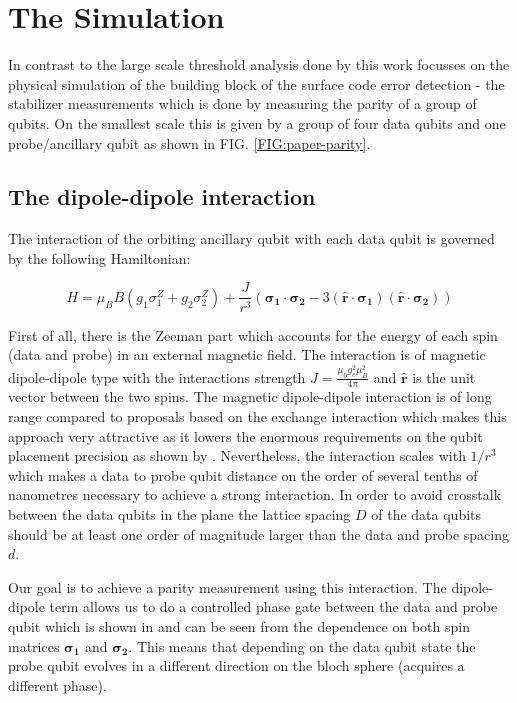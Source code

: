 \section{The Simulation}
In contrast to the large scale threshold analysis done by \citet{OGorman2016} this work focusses on the physical simulation of the building block of the surface code error detection - the stabilizer measurements which is done by measuring the parity of a group of qubits. On the smallest scale this is given by a group of four data qubits and one probe/ancillary qubit as shown in FIG. \ref{FIG:paper-parity}. 

\subsection{The dipole-dipole interaction}\label{sec:dipole-dipole}

The interaction of the orbiting ancillary qubit with each data qubit is governed by the following Hamiltonian:

\begin{equation*}
H = \mu_B B( g_1 \sigma_1^Z + g_2 \sigma_2^Z) + \frac{J}{r^3} ( \mathbf{\sigma_1} \cdot \mathbf{\sigma_2} - 3 ( \hat{\mathbf{r}} \cdot \mathbf{\sigma_1}) ( \hat{\mathbf{r}}\cdot \mathbf{\sigma_2}))
\end{equation*}

First of all, there is the Zeeman part which accounts for the energy of each spin (data and probe) in an external magnetic field. The interaction is of magnetic dipole-dipole type with the interactions strength $J=\frac{\mu_0 g_e^2 \mu_B^2}{4\pi}$ and $\hat{\mathbf{r}}$ is the unit vector between the two spins. The magnetic dipole-dipole interaction is of long range compared to proposals based on the exchange interaction \cite{Kane1998a} which makes this approach very attractive as it lowers the enormous requirements on the qubit placement precision as shown by \citet{OGorman2016}. Nevertheless, the interaction scales with $1/r^3$ which makes a data to probe qubit distance on the order of several tenths of nanometres necessary to achieve a strong interaction. In order to avoid crosstalk between the data qubits in the plane the lattice spacing $D$ of the data qubits should be at least one order of magnitude larger than the data and probe spacing $d$. 

Our goal is to achieve a parity measurement using this interaction. The dipole-dipole term allows us to do a controlled phase gate between the data and probe qubit which is shown in \cite{OGorman2016} and can be seen from the dependence on both spin matrices $\mathbf{\sigma_1}$ and $\mathbf{\sigma_2}$. This means that depending on the data qubit state the probe qubit evolves in a different direction on the bloch sphere (acquires a different phase). 

